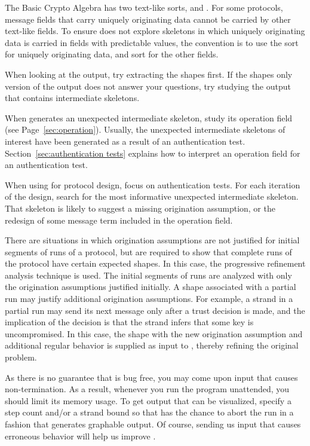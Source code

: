 \documentclass[12pt]{article}
\begin{document}
The Basic Crypto Algebra has two text-like sorts,  and
.  For some protocols, message fields that carry uniquely
originating data cannot be carried by other text-like fields.  To
ensure {\cpsa} does not explore skeletons in which uniquely
originating data is carried in fields with predictable values, the
convention is to use the sort  for uniquely originating
data, and sort  for the other fields.

When looking at the output, try extracting the shapes first.  If the
shapes only version of the output does not answer your questions, try
studying the output that contains intermediate skeletons.

When {\cpsa} generates an unexpected intermediate skeleton, study its
operation field (see Page~\ref{sec:operation}).  Usually, the
unexpected intermediate skeletons of interest have been generated as a
result of an authentication test.  Section~\ref{sec:authentication
  tests} explains how to interpret an operation field for an
authentication test.

When using {\cpsa} for protocol design, focus on authentication tests.
For each iteration of the design, search for the most informative
unexpected intermediate skeleton.  That skeleton is likely to suggest
a  missing origination assumption, or the redesign of some message
term included in the operation field.

There are situations in which origination assumptions are not
justified for initial segments of runs of a protocol, but are required
to show that complete runs of the protocol have certain expected
shapes.  In this case, the progressive refinement analysis technique
is used.  The initial segments of runs are analyzed with only the
origination assumptions justified initially.  A shape associated with
a partial run may justify additional origination assumptions.  For
example, a strand in a partial run may send its next message only
after a trust decision is made, and the implication of the decision is
that the strand infers that some key is uncompromised.  In this
case, the shape with the new origination assumption and additional
regular behavior is supplied as input to {\cpsa}, thereby refining the
original problem.

As there is no guarantee that {\cpsa} is bug free, you may come upon
input that causes non-termination.  As a result, whenever you run the
program unattended, you should limit its memory usage.  To get output
that can be visualized, specify a step count and/or a strand bound so
that {\cpsa} has the chance to abort the run in a fashion that
generates graphable output.  Of course, sending us input that causes
erroneous behavior will help us improve {\cpsa}.
\end{document}
